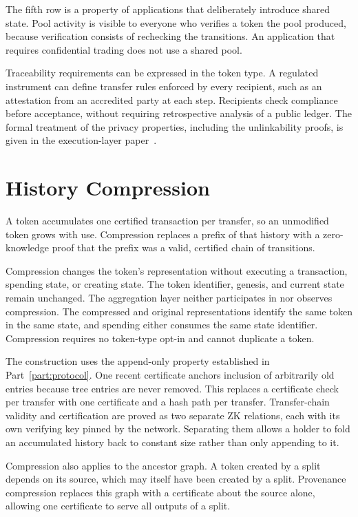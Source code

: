 The fifth row is a property of applications that deliberately introduce shared state. Pool activity is visible to everyone who verifies a token the pool produced, because verification consists of rechecking the transitions. An application that requires confidential trading does not use a shared pool.

Traceability requirements can be expressed in the token type. A regulated instrument can define transfer rules enforced by every recipient, such as an attestation from an accredited party at each step. Recipients check compliance before acceptance, without requiring retrospective analysis of a public ledger. The formal treatment of the privacy properties, including the unlinkability proofs, is given in the execution-layer paper~\cite{exemodel}.

\section{History Compression}

A token accumulates one certified transaction per transfer, so an unmodified token grows with use. Compression replaces a prefix of that history with a zero-knowledge proof that the prefix was a valid, certified chain of transitions.

Compression changes the token's representation without executing a transaction, spending state, or creating state. The token identifier, genesis, and current state remain unchanged. The aggregation layer neither participates in nor observes compression. The compressed and original representations identify the same token in the same state, and spending either consumes the same state identifier. Compression requires no token-type opt-in and cannot duplicate a token.

The construction uses the append-only property established in Part~\ref{part:protocol}. One recent certificate anchors inclusion of arbitrarily old entries because tree entries are never removed. This replaces a certificate check per transfer with one certificate and a hash path per transfer. Transfer-chain validity and certification are proved as two separate ZK relations, each with its own verifying key pinned by the network. Separating them allows a holder to fold an accumulated history back to constant size rather than only appending to it.

Compression also applies to the ancestor graph. A token created by a split depends on its source, which may itself have been created by a split. Provenance compression replaces this graph with a certificate about the source alone, allowing one certificate to serve all outputs of a split.

